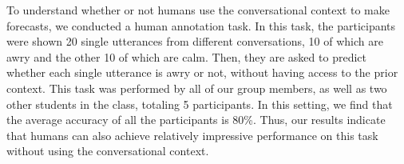 %
To understand whether or not humans use the conversational context to make forecasts, 
we conducted a human annotation task. 
%
In this task, the participants were shown 20 single utterances from different 
conversations, 10 of which are awry and the other 10 of which are calm. 
%
Then, they are asked to predict whether each single utterance is awry 
or not, without having access to the prior context.
%
This task was performed by all of our group members, as well as two other students 
in the class, totaling 5 participants. 
%
In this setting, we find that the average accuracy of all the participants is 80\%. 
%
Thus, our results indicate that humans can also achieve relatively impressive 
performance on this task without using the conversational context.
